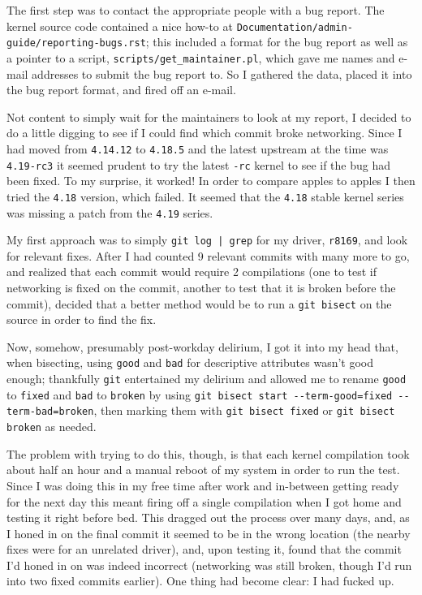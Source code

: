 \documentclass{article}
\begin{document}
The first step was to contact the appropriate people with a bug report.  The kernel source code contained a nice how-to at \texttt{Documentation/admin-guide/reporting-bugs.rst}; this included a format for the bug report as well as a pointer to a script, \texttt{scripts/get_maintainer.pl}, which gave me names and e-mail addresses to submit the bug report to.  So I gathered the data, placed it into the bug report format, and fired off an e-mail.

Not content to simply wait for the maintainers to look at my report, I decided to do a little digging to see if I could find which commit broke networking.  Since I had moved from \texttt{4.14.12} to \texttt{4.18.5} and the latest upstream at the time was \texttt{4.19-rc3} it seemed prudent to try the latest \texttt{-rc} kernel to see if the bug had been fixed.  To my surprise, it worked!  In order to compare apples to apples I then tried the \texttt{4.18} version, which failed.  It seemed that the \texttt{4.18} stable kernel series was missing a patch from the \texttt{4.19} series.

My first approach was to simply \texttt{git log | grep} for my driver, \texttt{r8169}, and look for relevant fixes.  After I had counted 9 relevant commits with many more to go, and realized that each commit would require 2 compilations (one to test if networking is fixed on the commit, another to test that it is broken before the commit), decided that a better method would be to run a \texttt{git bisect} on the source in order to find the fix.

Now, somehow, presumably post-workday delirium, I got it into my head that, when bisecting, using \texttt{good} and \texttt{bad} for descriptive attributes wasn't good enough; thankfully \texttt{git} entertained my delirium and allowed me to rename \texttt{good} to \texttt{fixed} and \texttt{bad} to \texttt{broken} by using \texttt{git bisect start \verb$-$-term-good=fixed \verb$-$-term-bad=broken}, then marking them with \texttt{git bisect fixed} or \texttt{git bisect broken} as needed.

The problem with trying to do this, though, is that each kernel compilation took about half an hour and a manual reboot of my system in order to run the test.  Since I was doing this in my free time after work and in-between getting ready for the next day this meant firing off a single compilation when I got home and testing it right before bed.  This dragged out the process over many days, and, as I honed in on the final commit it seemed to be in the wrong location (the nearby fixes were for an unrelated driver), and, upon testing it, found that the commit I'd honed in on was indeed incorrect (networking was still broken, though I'd run into two fixed commits earlier).  One thing had become clear: I had fucked up.
\end{document}
